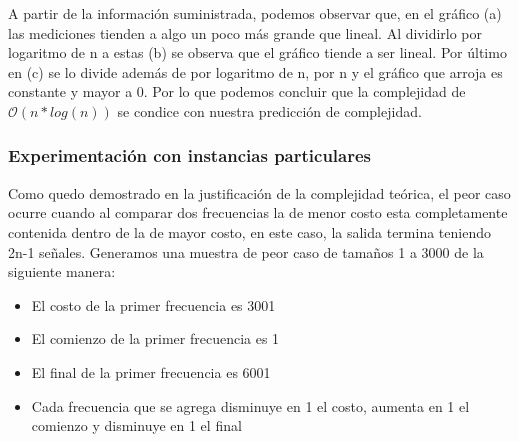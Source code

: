 A partir de la información suministrada, podemos observar que, en el gráfico (a) las mediciones tienden a algo un poco más grande que lineal. Al dividirlo por logaritmo de n a estas (b) se observa que el gráfico tiende a ser lineal. Por último en (c) se lo divide además de por logaritmo de n, por n y el gráfico que arroja es constante y mayor a 0. Por lo que podemos concluir que la complejidad de $\mathcal{O}(n*log(n))$ se condice con nuestra predicción de complejidad.

\subsubsection{Experimentación con instancias particulares}

Como quedo demostrado en la justificación de la complejidad teórica, el peor caso ocurre cuando al comparar dos frecuencias la de menor costo esta completamente contenida dentro de la de mayor costo, en este caso, la salida termina teniendo 2n-1 señales. Generamos una muestra de peor caso de tamaños 1 a 3000 de la siguiente manera:
\begin{itemize}
	\item El costo de la primer frecuencia es 3001
	\item El comienzo de la primer frecuencia es 1
    \item El final de la primer frecuencia es 6001
    \item Cada frecuencia que se agrega disminuye en 1 el costo, aumenta en 1 el comienzo y disminuye en 1 el final
\end{itemize}


